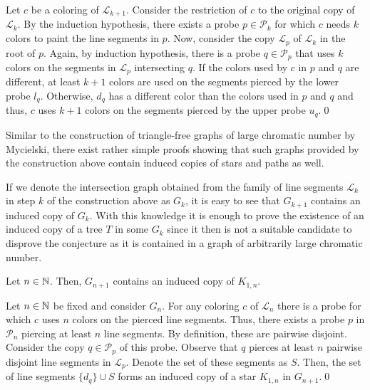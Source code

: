 \begin{prf}
Let $c$ be a coloring of $\mathcal{L}_{k+1}$. Consider the restriction of $c$ to the original copy of $\mathcal{L}_k$. By the induction hypothesis, there exists a probe $p\in\mathcal{P}_k$ for which $c$ needs $k$ colors to paint the line segments in $p$. Now, consider the copy $\mathcal{L}_p$ of $\mathcal{L}_k$ in the root of $p$. Again, by induction hypothesis, there is a probe $q\in\mathcal{P}_p$ that uses $k$ colors on the segments in $\mathcal{L}_p$ intersecting $q$. If the colors used by $c$ in $p$ and $q$ are different, at least $k+1$ colors are used on the segments pierced by the lower probe $l_q$. Otherwise, $d_q$ has a different color than the colors used in $p$ and $q$ and thus, $c$ uses $k+1$ colors on the segments pierced by the upper probe $u_q$.\qed
\end{prf}

Similar to the construction of triangle-free graphs of large chromatic number by Mycielski, there exist rather simple proofs showing that such graphs provided by the construction above contain induced copies of stars and paths as well.

\begin{note}
If we denote the intersection graph obtained from the family of line segments $\mathcal{L}_k$ in step $k$ of the construction above as $G_k$, it is easy to see that $G_{k+1}$ contains an induced copy of $G_k$. With this knowledge it is enough to prove the existence of an induced copy of a tree $T$ in some $G_k$ since it then is not a suitable candidate to disprove the conjecture as it is contained in a graph of arbitrarily large chromatic number.
\end{note}

\begin{thm}
Let $n\in\mathbb{N}$. Then, $G_{n+1}$ contains an induced copy of $K_{1,n}$.
\end{thm}
\begin{prf}
Let $n\in\mathbb{N}$ be fixed and consider $G_n$. For any coloring $c$ of $\mathcal{L}_n$ there is a probe for which $c$ uses $n$ colors on the pierced line segments. Thus, there exists a probe $p$ in $\mathcal{P}_n$ piercing at least $n$ line segments. By definition, these are pairwise disjoint. Consider the copy $q\in\mathcal{P}_p$ of this probe. Observe that $q$ pierces at least $n$ pairwise disjoint line segments in $\mathcal{L}_p$. Denote the set of these segments as $S$. Then, the set of line segments $\lbrace d_q\rbrace\cup S$ forms an induced copy of a star $K_{1,n}$ in $G_{n+1}$.\qed   
\end{prf}

